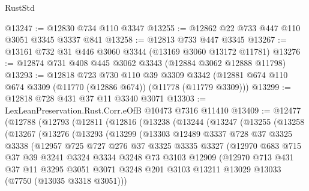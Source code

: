 \begin{lexlean}{RustStd}
\begin{coremodule}
@13247 := @12830 @734 @110 @3347
@13255 := @12862 @22 @733 @447 @110 @3051 @3345 @3337 @841
@13258 := @12813 @733 @447 @3345
@13267 := @13161 @732 @31 @446 @3060 @3344 (@13169 @3060 @13172 @11781)
@13276 := @12874 @731 @408 @445 @3062 @3343 (@12884 @3062 @12888 @11798)
@13293 := @12818
    @723
    @730
    @110
    @39
    @3309
    @3342
    (@12881 @674 @110 @674 @3309 (@11770 (@12886 @674)) (@11778 (@11779 @3309)))
@13299 := @12818 @728 @431 @37 @11 @3340 @3071
@13303 := LexLeanPreservation.Rust.Corr.eOfB @10473 @7316 @11410
@13409 := @12477
    (@12788
      (@12793
        (@12811
          (@12816
            (@13238
              (@13244
                (@13247
                  (@13255
                    (@13258
                      (@13267
                        (@13276
                          (@13293
                            (@13299
                              (@13303
                                @12489
                                @3337
                                @728
                                @37
                                @3325
                                @3338
                                (@12957
                                  @725
                                  @727
                                  @276
                                  @37
                                  @3325
                                  @3335
                                  @3327
                                  (@12970
                                    @683
                                    @715
                                    @37
                                    @39
                                    @3241
                                    @3324
                                    @3334
                                    @3248
                                    @73
                                    @3103
                                    @12909
                                    (@12970
                                      @713
                                      @431
                                      @37
                                      @11
                                      @3295
                                      @3051
                                      @3071
                                      @3248
                                      @201
                                      @3103
                                      @13211
                                      @13029
                                      @13033
                                      (@7750 (@13035 @3318 @3051)))

\end{coremodule}
\end{lexlean}
